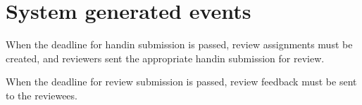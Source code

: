 \documentclass[Main]{subfiles}
\begin{document}
\section{System generated events}

\begin{EventTable}
\Record
{When the deadline for handin submission is passed, review assignments must be created, and reviewers sent the appropriate handin submission for review.}{}{}

\Record
{When the deadline for review submission is passed, review feedback must be sent to the reviewees.}{}{}

\end{EventTable}
\end{document}
